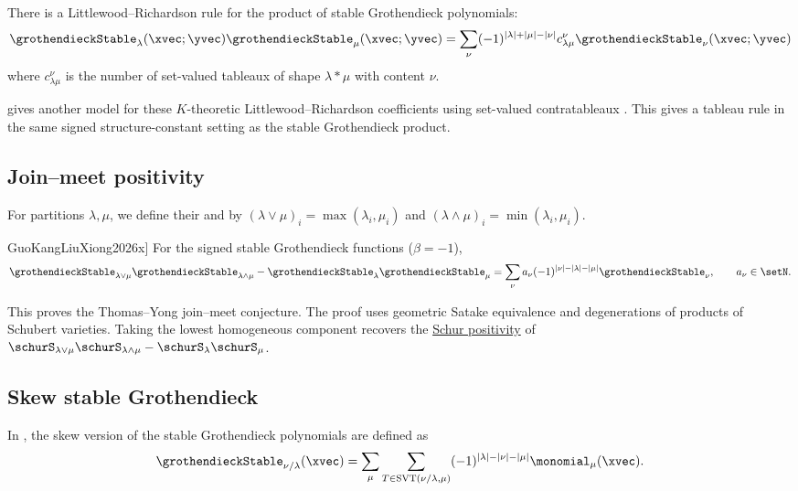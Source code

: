 There is a Littlewood--Richardson rule for the product of stable Grothendieck polynomials:
\[
\grothendieckStable_{\lambda}(\xvec;\yvec) \grothendieckStable_{\mu}(\xvec;\yvec) = \sum_{\nu}
(-1)^{|\lambda|+|\mu|-|\nu|} c_{\lambda\mu}^{\nu} \grothendieckStable_{\nu}(\xvec;\yvec)
\]
where $c_{\lambda\mu}^{\nu}$ is the number of set-valued tableaux of shape $\lambda * \mu$ with content $\nu$.

 gives another model for these
$K$-theoretic Littlewood--Richardson coefficients using set-valued
contratableaux \cite{Kundu2025LR}.  This gives a tableau rule in the
same signed structure-constant setting as the stable Grothendieck product.



\subsection[grothendieckJoinMeet]{Join--meet positivity}

For partitions $\lambda,\mu$, we define their  and 
by $(\lambda\vee\mu)_i=\max(\lambda_i,\mu_i)$ and
$(\lambda\wedge\mu)_i=\min(\lambda_i,\mu_i)$.

\begin{theorem}[Guo--Kang--Liu--Xiong, \cite[Thm.~A]{GuoKangLiuXiong2026x}]
For the signed stable Grothendieck functions ($\beta=-1$),
\[
 \grothendieckStable_{\lambda\vee\mu}\grothendieckStable_{\lambda\wedge\mu}
 -\grothendieckStable_\lambda\grothendieckStable_\mu
 =\sum_\nu a_\nu(-1)^{|\nu|-|\lambda|-|\mu|}\grothendieckStable_\nu,
 \qquad a_\nu\in\setN.
\]
\end{theorem}

This proves the Thomas--Yong join--meet conjecture.
The proof uses geometric Satake equivalence and degenerations of products
of Schubert varieties. Taking the lowest homogeneous component recovers
the \hyperref[schurPositiveDefinition]{Schur positivity} of
$\schurS_{\lambda\vee\mu}\schurS_{\lambda\wedge\mu}
-\schurS_\lambda\schurS_\mu$.

\subsection[grothendieckSkewStable]{Skew stable Grothendieck}


In \cite{Buch2002,LiMorseShields2016},
the skew version of the stable Grothendieck polynomials are defined as
\begin{align}
\grothendieckStable_{\nu/\lambda}(\xvec) = \sum_{\mu}
\sum_{T \in \mathrm{SVT}(\nu/\lambda,\mu)} (-1)^{|\lambda|-|\nu|-|\mu|} \monomial_\mu(\xvec).
\end{align}

